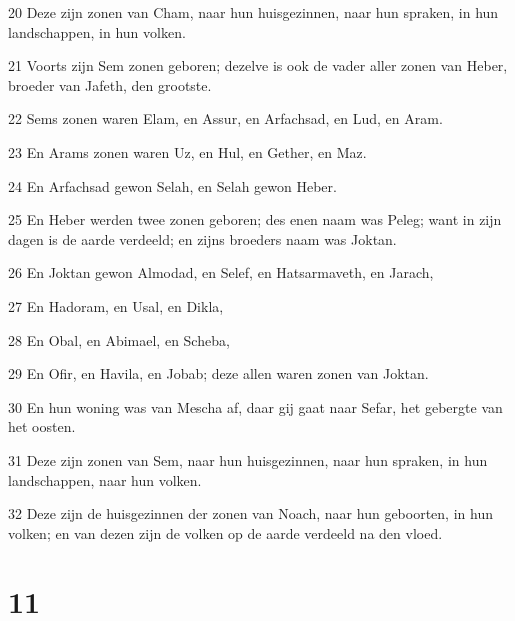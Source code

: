 \par 20 Deze zijn zonen van Cham, naar hun huisgezinnen, naar hun spraken, in hun landschappen, in hun volken.
\par 21 Voorts zijn Sem zonen geboren; dezelve is ook de vader aller zonen van Heber, broeder van Jafeth, den grootste.
\par 22 Sems zonen waren Elam, en Assur, en Arfachsad, en Lud, en Aram.
\par 23 En Arams zonen waren Uz, en Hul, en Gether, en Maz.
\par 24 En Arfachsad gewon Selah, en Selah gewon Heber.
\par 25 En Heber werden twee zonen geboren; des enen naam was Peleg; want in zijn dagen is de aarde verdeeld; en zijns broeders naam was Joktan.
\par 26 En Joktan gewon Almodad, en Selef, en Hatsarmaveth, en Jarach,
\par 27 En Hadoram, en Usal, en Dikla,
\par 28 En Obal, en Abimael, en Scheba,
\par 29 En Ofir, en Havila, en Jobab; deze allen waren zonen van Joktan.
\par 30 En hun woning was van Mescha af, daar gij gaat naar Sefar, het gebergte van het oosten.
\par 31 Deze zijn zonen van Sem, naar hun huisgezinnen, naar hun spraken, in hun landschappen, naar hun volken.
\par 32 Deze zijn de huisgezinnen der zonen van Noach, naar hun geboorten, in hun volken; en van dezen zijn de volken op de aarde verdeeld na den vloed.

\chapter{11}

